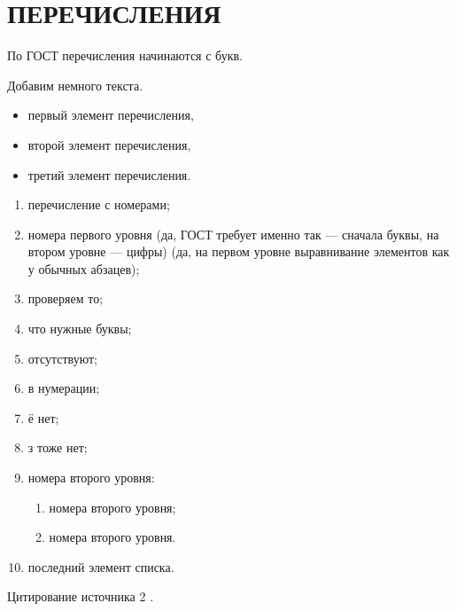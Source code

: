\section{ПЕРЕЧИСЛЕНИЯ}

По ГОСТ перечисления начинаются с букв.

Добавим немного текста. \lipsum[1][1]

\begin{itemize}
    \item первый элемент перечисления,
    \item второй элемент перечисления,
    \item третий элемент перечисления.
\end{itemize}

\lipsum[1][1]

\begin{enumerate}
    \item перечисление с номерами;
    \item номера первого уровня (да, ГОСТ требует именно так --- сначала буквы, 
    на втором уровне --- цифры)
    (да, на первом уровне выравнивание элементов как у обычных абзацев);
    \item проверяем то;
    \item что нужные буквы;
    \item отсутствуют;
    \item в нумерации;
    \item ё нет;
    \item з тоже нет;
    \item номера второго уровня:
        \begin{enumerate}
            \item номера второго уровня;
            \item номера второго уровня.
        \end{enumerate}
    \item последний элемент списка.
\end{enumerate}

Цитирование источника 2 \cite{Article3}.
